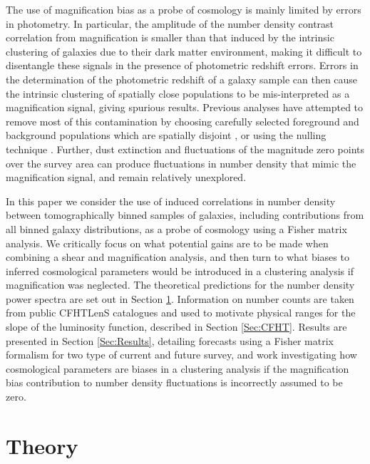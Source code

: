\documentclass[useAMS,usenatbib,times,letter,amssymb]{mn2e}
\begin{document}
The use of magnification bias as a probe of cosmology is mainly limited by errors in photometry. In particular, the amplitude of the number density contrast correlation from magnification is smaller than that induced by the intrinsic clustering of galaxies due to their dark matter environment, making it difficult to disentangle these signals in the presence of photometric redshift errors. Errors in the determination of the photometric redshift of a galaxy sample can then cause the intrinsic clustering of spatially close populations to be mis-interpreted as a magnification signal, giving spurious results. Previous analyses have attempted to remove most of this contamination by choosing carefully selected foreground and background populations which are spatially disjoint \cite[such as][]{Hildebrandt:2009p845, VanWaerbeke:2010p8}, or using the nulling technique \citep{Heavens:2011p629}. Further, dust extinction and fluctuations of the magnitude zero points over the survey area can produce fluctuations in number density that mimic the magnification signal, and remain relatively unexplored.

In this paper we consider the use of induced correlations in number density between tomographically binned samples of galaxies, including contributions from all binned galaxy distributions, as a probe of cosmology using a Fisher matrix analysis. We critically focus on what potential gains are to be made when combining a shear and magnification analysis, and then turn to what biases to inferred cosmological parameters would be introduced in a clustering analysis if magnification was neglected. The theoretical predictions for the number density power spectra are set out in Section \ref{Sec:2ptCorrelations}. Information on number counts are taken from public CFHTLenS catalogues \citep{Heymans:2012p1653,Erben:2012p1556} and used to motivate physical ranges for the slope of the luminosity function, described in Section \ref{Sec:CFHT}. Results are presented in Section \ref{Sec:Results}, detailing forecasts using a Fisher matrix formalism for two type of current and future survey, and work investigating how cosmological parameters are biases in a clustering analysis if the magnification bias contribution to number density fluctuations is incorrectly assumed to be zero. %
	
\section[]{Theory}\label{Sec:2ptCorrelations}
\end{document}
